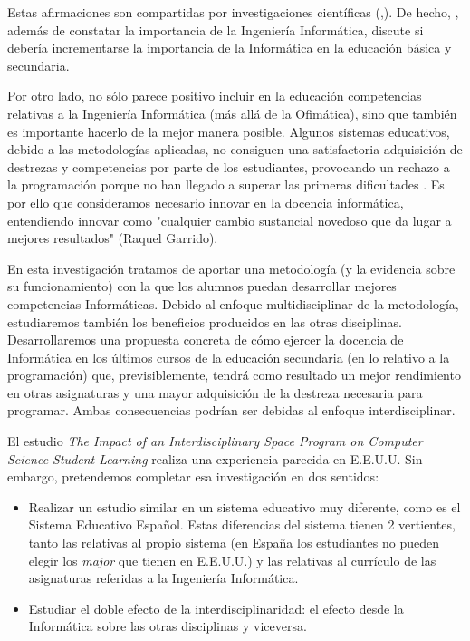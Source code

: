 \documentclass[palatino,miniheader]{apuntesURJC}
\begin{document}
Estas afirmaciones son compartidas por investigaciones científicas (\cite{CSIsImportant},\cite{CSArguing}). 
%
De hecho, \cite{CSArguing}, además de constatar la importancia de la Ingeniería Informática, discute si debería incrementarse la importancia de la Informática en la educación básica y secundaria.

Por otro lado, no sólo parece positivo incluir en la educación competencias relativas a la Ingeniería Informática (más allá de la Ofimática), sino que también es importante hacerlo de la mejor manera posible.
%
Algunos sistemas educativos, debido a las metodologías aplicadas, no consiguen una satisfactoria adquisición de destrezas y competencias por parte de los estudiantes, provocando un rechazo a la programación porque no han llegado a superar las primeras dificultades \cite{CSArguing}. 
%
Es por ello que consideramos necesario innovar en la docencia informática, entendiendo innovar como "cualquier cambio sustancial novedoso que da lugar a mejores resultados" (Raquel Garrido).

En esta investigación tratamos de aportar una metodología (y la evidencia sobre su funcionamiento) con la que los alumnos puedan desarrollar mejores competencias Informáticas. 
%
Debido al enfoque multidisciplinar de la metodología, estudiaremos también los beneficios producidos en las otras disciplinas.
%
Desarrollaremos una propuesta concreta de cómo ejercer la docencia de Informática en los últimos cursos de la educación secundaria (en lo relativo a la programación) que, previsiblemente, tendrá como resultado un mejor rendimiento en otras asignaturas y una mayor adquisición de la destreza necesaria para programar.
%
Ambas consecuencias podrían ser debidas al enfoque interdisciplinar.

El estudio \textit{The Impact of an Interdisciplinary Space Program on Computer Science Student Learning} \cite{Interdiscipline} realiza una experiencia parecida en E.E.U.U. Sin embargo, pretendemos completar esa investigación en dos sentidos: 
\begin{itemize}
	\item Realizar un estudio similar en un sistema educativo muy diferente, como es el Sistema Educativo Español. 
	Estas diferencias del sistema tienen 2 vertientes, tanto las relativas al propio sistema (en España los estudiantes no pueden elegir los \textit{major} que tienen en E.E.U.U.) y las relativas al currículo de las asignaturas referidas a la Ingeniería Informática.
	\item Estudiar el doble efecto de la interdisciplinaridad: el efecto desde la Informática sobre las otras disciplinas y viceversa.
\end{itemize}
\end{document}
